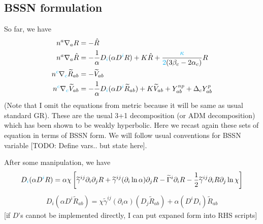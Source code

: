 \documentclass[a4paper,oneside,openany,11pt]{memoir}
\numberwithin{equation}{section} %
\newcommand{\aaron}[1]{{\color{cyan} #1}}
\newcommand{\TODO}[1]{{\color{red}[}{\color{red}TODO:} {\color{blue}#1}{\color{red}]}}
\begin{document}
\subsection{BSSN formulation}
So far, we have
\begin{align}
n^a \nabla_a R &= - \hat{R}  \\
n^a \nabla_a \hat{R} &= -  \frac{1}{\alpha} D_\aaron{i} (\alpha D^\aaron{i} R) + K \hat{R} + \frac{\aaron{\kappa}}{\aaron{2}(3\beta_c - 2 \alpha_c)} R\\
n^\aaron{c} \nabla_\aaron{c} \widetilde{R}_{ab} &= - \widetilde{V}_{ab}  \\
n^\aaron{c} \nabla_\aaron{c} \widetilde{V}_{ab} &= -  \frac{1}{\alpha} D_\aaron{i}(\alpha D^\aaron{i} \widetilde{R}_{ab} ) + K \widetilde{V}_{ab} + Y^{np}_{ab} + \Delta_c Y^{p}_{ab}
\end{align}
(Note that I omit the equations from metric because it will be same as usual standard GR). 
These are the usual 3+1 decomposition (or ADM decomposition) which has been shown to 
be weakly hyperbolic. Here we recast again these sets of equation in terms of BSSN form.
We will follow usual conventions for BSSN variable \TODO{Define vars.. but state here}.

After some manipulation, we have
\begin{align}
\label{eqn:bssn:inter1}
D_\aaron{i} ( \alpha D^\aaron{i} R) = \alpha \chi \left[\widetilde{\gamma}^{ij} \partial_i \partial_j R + \widetilde{\gamma}^{ij} (\partial_i  \ln \alpha) \partial_j R - \widetilde{\Gamma}^i \partial_i R - \frac{1}{2} \widetilde{\gamma}^{ij} \partial_i R \partial_j \ln \chi \right]
\end{align}
\aaron{
\begin{align}
	D_i( \alpha D^i \widetilde{R}_{ab}) = 
	\chi\widetilde{\gamma}^{ij}(\partial_i\alpha) (D_j \widetilde{R}_{ab})
	+ \alpha (D^i D_i) \widetilde{R}_{ab}
\end{align}
[if $D$'s cannot be implemented directly, I can put expaned form into RHS scripts]}
\end{document}

